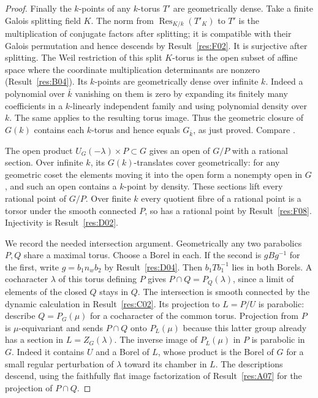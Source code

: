 \documentclass[11pt,a4paper,openany,oneside]{book}
\theoremstyle{resultstyle}
\theoremstyle{definition}
\numberwithin{equation}{chapter}
\begin{document}
\begin{proof}
Finally the \(k\)-points of any \(k\)-torus \(T'\) are
geometrically dense. Take a finite Galois splitting field
\(K\). The norm from \(\operatorname{Res}_{K/k}(T'_K)\)
to \(T'\) is the multiplication of conjugate factors
after splitting; it is compatible with their Galois
permutation and hence descends by Result~\ref{res:F02}.
It is surjective after splitting. The Weil restriction
of this split \(K\)-torus is the open subset of affine
space where the coordinate multiplication determinants
are nonzero (Result~\ref{res:B04}). Its \(k\)-points
are geometrically dense over infinite \(k\). Indeed
a polynomial over \(\bar k\) vanishing on them is zero
by expanding its finitely many coefficients in a
\(k\)-linearly independent family and using polynomial
density over \(k\). The same applies to the resulting
torus image. Thus the geometric closure of \(G(k)\)
contains each \(k\)-torus and hence equals \(G_{\bar k}\),
as just proved. Compare \cite[Section 17.j]{milne}.

The open product \(U_G(-\lambda)\times P\subset G\)
gives an open of \(G/P\) with a rational section.
Over infinite \(k\), its \(G(k)\)-translates cover
geometrically: for any geometric coset the elements
moving it into the open form a nonempty open in \(G\),
and such an open contains a \(k\)-point by density.
These sections lift every rational point of \(G/P\).
Over finite \(k\) every quotient fibre of a rational point
is a torsor under the smooth connected \(P\), so has a
rational point by Result~\ref{res:F08}.
Injectivity is Result~\ref{res:D02}.

We record the needed intersection argument. Geometrically
any two parabolics \(P,Q\) share a maximal torus.
Choose a Borel in each. If the second is \(gBg^{-1}\)
for the first, write \(g=b_1n_wb_2\) by
Result~\ref{res:D04}. Then \(b_1Tb_1^{-1}\) lies
in both Borels. A cocharacter \(\lambda\) of this torus
defining \(P\) gives \(P\cap Q=P_Q(\lambda)\), since a
limit of elements of the closed \(Q\) stays in \(Q\).
The intersection is smooth connected by the dynamic
calculation in Result~\ref{res:C02}.
Its projection to \(L=P/U\) is parabolic: describe
\(Q=P_G(\mu)\) for a cocharacter of the common torus.
Projection from \(P\) is \(\mu\)-equivariant and sends
\(P\cap Q\) onto \(P_L(\mu)\) because this latter group
already has a section in \(L=Z_G(\lambda)\).
The inverse image of \(P_L(\mu)\) in \(P\) is parabolic
in \(G\). Indeed it contains \(U\) and a Borel of \(L\),
whose product is the Borel of \(G\) for a small regular
perturbation of \(\lambda\) toward its chamber in \(L\).
The descriptions descend, using the faithfully flat
image factorization of Result~\ref{res:A07} for the
projection of \(P\cap Q\).


\end{proof}
\end{document}
